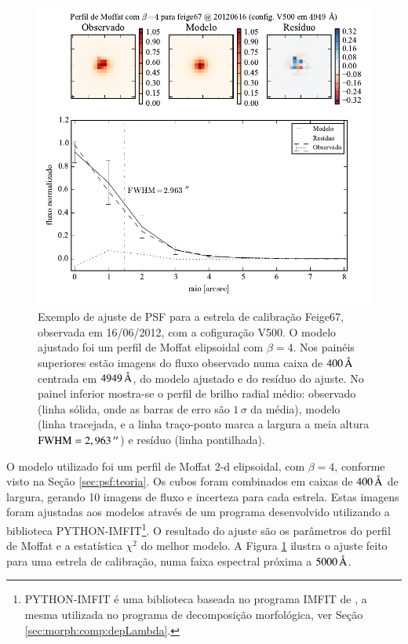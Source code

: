 \begin{figure}
	\includegraphics{figuras/PSFMoffatBeta4_exemplo}
	\caption[Exemplo de ajuste de PSF para estrela de calibração.]
	{Exemplo de ajuste de PSF para a estrela de calibração Feige67, observada em
	16/06/2012, com a cofiguração V500. O modelo ajustado foi um perfil de
	Moffat elipsoidal com $\beta=4$. Nos painéis superiores estão imagens do fluxo
	observado numa caixa de $400\,\text{\normalfont\AA}$ centrada em $4949\,\text{\normalfont\AA}$,
	do modelo ajustado e do resíduo do ajuste. No painel inferior mostra-se o
	perfil de brilho radial médio: observado (linha sólida, onde as barras de erro
	são $1\,\sigma$ da média), modelo (linha tracejada, e a linha traço-ponto marca
	a largura a meia altura $\mathrm{FWHM}=2,963\,^{\prime\prime}$) e resíduo (linha
	pontilhada).}
	\label{fig:PSFExemplo}
\end{figure}

O modelo utilizado foi um perfil de Moffat 2-d elipsoidal, com $\beta\!=\!4$,
conforme visto na Seção \ref{sec:psf:teoria}. Os cubos foram combinados em
caixas de $400\,\text{\normalfont\AA}$ de largura, gerando 10 imagens de fluxo e incerteza
para cada estrela. Estas imagens foram ajustadas aos modelos através de um
programa desenvolvido utilizando a biblioteca PYTHON-IMFIT\footnote{PYTHON-IMFIT
é uma biblioteca baseada no programa IMFIT de \citet{Erwin2015}, a mesma
utilizada no programa de decomposição morfológica, ver Seção
\ref{sec:morph:comp:depLambda}.}. O resultado do ajuste são os parâmetros do
perfil de Moffat e a estatística $\chi^2$ do melhor modelo. A Figura
\ref{fig:PSFExemplo} ilustra o ajuste feito para uma estrela de calibração, numa
faixa espectral próxima a $5000\,\text{\normalfont\AA}$.

